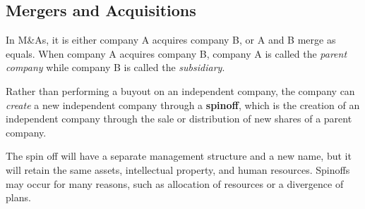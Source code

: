 \documentclass{article}
\begin{document}
  \subsection{Mergers and Acquisitions}

    In M\&As, it is either company A acquires company B, or A and B merge as equals. When company A acquires company B, company A is called the \textit{parent company} while company B is called the \textit{subsidiary}. 

    \begin{definition}[Spinoff]
      \label{def:spinoff}
      Rather than performing a buyout on an independent company, the company can \textit{create} a new independent company through a \textbf{spinoff}, which is the creation of an independent company through the sale or distribution of new shares of a parent company. 

      The spin off will have a separate management structure and a new name, but it will retain the same assets, intellectual property, and human resources. Spinoffs may occur for many reasons, such as allocation of resources or a divergence of plans. 
    \end{definition}
\end{document}
